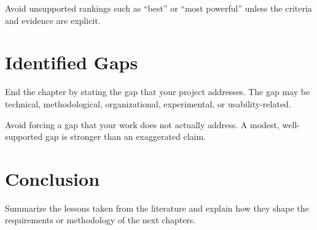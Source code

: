 Avoid unsupported rankings such as ``best'' or ``most powerful'' unless the criteria and evidence are explicit.

\section{Identified Gaps}
End the chapter by stating the gap that your project addresses. The gap may be technical, methodological, organizational, experimental, or usability-related.

Avoid forcing a gap that your work does not actually address. A modest, well-supported gap is stronger than an exaggerated claim.

\section{Conclusion}
Summarize the lessons taken from the literature and explain how they shape the requirements or methodology of the next chapters.